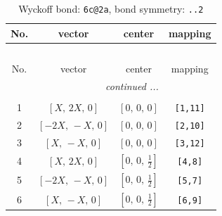 \documentclass[fleqn,8pt]{jsarticle}
\begin{document}
\begin{longtable}{cccc}
\caption{Wyckoff bond: {\tt 6c@2a}, bond symmetry: {\tt ..2}}
 \\
 \hline \hline
No. & vector & center & mapping \\ \hline \endfirsthead

\multicolumn{3}{l}{\tablename\ \thetable{}} \\
 \hline \hline
No. & vector & center & mapping \\ \hline \endhead

 \hline \hline
\multicolumn{3}{r}{\footnotesize\it continued ...} \\ \endfoot

 \hline \hline
\multicolumn{3}{r}{} \\ \endlastfoot

1 & $\left[ X,\, 2 X,\, 0 \right]$ & $\left[ 0,\, 0,\, 0 \right]$ & {\tt [1,11]} \\ \hline
2 & $\left[ - 2 X,\, - X,\, 0 \right]$ & $\left[ 0,\, 0,\, 0 \right]$ & {\tt [2,10]} \\ \hline
3 & $\left[ X,\, - X,\, 0 \right]$ & $\left[ 0,\, 0,\, 0 \right]$ & {\tt [3,12]} \\ \hline
4 & $\left[ X,\, 2 X,\, 0 \right]$ & $\left[ 0,\, 0,\, \frac{1}{2} \right]$ & {\tt [4,8]} \\ \hline
5 & $\left[ - 2 X,\, - X,\, 0 \right]$ & $\left[ 0,\, 0,\, \frac{1}{2} \right]$ & {\tt [5,7]} \\ \hline
6 & $\left[ X,\, - X,\, 0 \right]$ & $\left[ 0,\, 0,\, \frac{1}{2} \right]$ & {\tt [6,9]} \\
\end{longtable}
\renewcommand{\arraystretch}{1.2}
\end{document}
